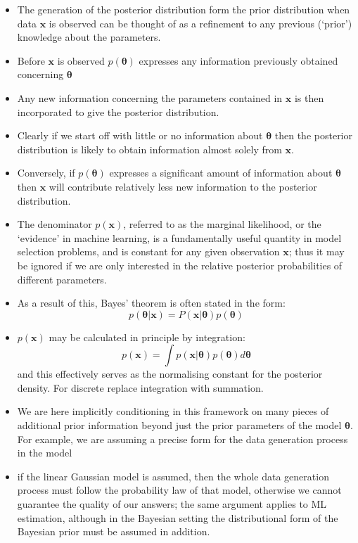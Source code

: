 \documentclass[12pt]{article}
\newcommand{\thetab}{\boldsymbol{\theta}}
\newcommand{\xb}{\mathbf{x}}
\begin{document}
\begin{itemize}
      \item The generation of the posterior distribution form the prior distribution when data $\xb$ is observed can be thought of as a refinement to any previous (`prior') knowledge about the parameters.
      \item Before $\xb$ is observed $p(\thetab)$ expresses any information previously obtained concerning $\thetab$
      \item Any new information concerning the parameters contained in $\xb$ is then incorporated to give the posterior distribution.
      \item Clearly if we start off with little  or no information about $\thetab$ then the posterior distribution is likely to obtain information almost solely from $\xb$.
      \item Conversely, if $p(\thetab)$ expresses a significant amount of information about $\thetab$ then $\xb$ will contribute relatively less new information to the posterior distribution.
      \item The denominator $p(\xb)$, referred to as the marginal likelihood, or the `evidence' in machine learning, is a fundamentally useful quantity in model selection problems, and is constant for any given observation $\xb$; thus it may be ignored if we are only interested in the relative posterior probabilities of different parameters.
      \item As a result of this, Bayes' theorem is often stated in the form:
      \[
      p(\thetab | \xb) = P(\xb | \thetab) p(\thetab)
      \]
      \item $p(\xb)$ may be calculated in principle by integration:
      \[
      p(\xb) = \int p(\xb | \thetab) p(\thetab) d\thetab
      \]
      and this effectively serves as the normalising constant for the posterior density. For discrete replace integration with summation.
      \item We are here implicitly conditioning in this framework on many pieces of additional prior information beyond just the prior parameters of the model $\thetab$. For example, we are assuming a precise form for the data generation process in the model
      \item if the linear Gaussian model is assumed, then the whole data generation process must follow the probability law of that model, otherwise we cannot guarantee the quality of our answers; the same argument applies to ML estimation, although in the Bayesian setting the distributional form of the Bayesian prior must be assumed in addition.
      
\end{itemize}
\end{document}

